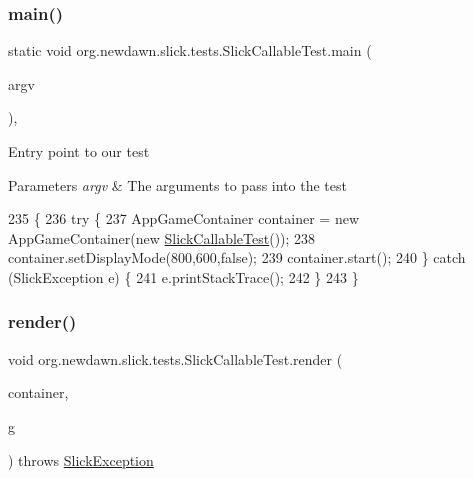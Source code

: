 \subsubsection{\texorpdfstring{main()}{main()}}
{\footnotesize\ttfamily static void org.\+newdawn.\+slick.\+tests.\+Slick\+Callable\+Test.\+main (\begin{DoxyParamCaption}\item[{String \mbox{[}$\,$\mbox{]}}]{argv }\end{DoxyParamCaption})\hspace{0.3cm}{\ttfamily [inline]}, {\ttfamily [static]}}

Entry point to our test


\begin{DoxyParams}{Parameters}
{\em argv} & The arguments to pass into the test \\
\hline
\end{DoxyParams}

\begin{DoxyCode}
235                                            \{
236         \textcolor{keywordflow}{try} \{
237             AppGameContainer container = \textcolor{keyword}{new} AppGameContainer(\textcolor{keyword}{new} 
      \mbox{\hyperlink{classorg_1_1newdawn_1_1slick_1_1tests_1_1_slick_callable_test_aa814ea910d589fd1b68da7138cae4d16}{SlickCallableTest}}());
238             container.setDisplayMode(800,600,\textcolor{keyword}{false});
239             container.start();
240         \} \textcolor{keywordflow}{catch} (SlickException e) \{
241             e.printStackTrace();
242         \}
243     \}
\end{DoxyCode}
\mbox{\label{classorg_1_1newdawn_1_1slick_1_1tests_1_1_slick_callable_test_aa0fe58472a8a6a8a9551182039368ef2}} 
\subsubsection{\texorpdfstring{render()}{render()}}
{\footnotesize\ttfamily void org.\+newdawn.\+slick.\+tests.\+Slick\+Callable\+Test.\+render (\begin{DoxyParamCaption}\item[{\mbox{\hyperlink{classorg_1_1newdawn_1_1slick_1_1_game_container}{Game\+Container}}}]{container,  }\item[{\mbox{\hyperlink{classorg_1_1newdawn_1_1slick_1_1_graphics}{Graphics}}}]{g }\end{DoxyParamCaption}) throws \mbox{\hyperlink{classorg_1_1newdawn_1_1slick_1_1_slick_exception}{Slick\+Exception}}\hspace{0.3cm}{\ttfamily [inline]}}

